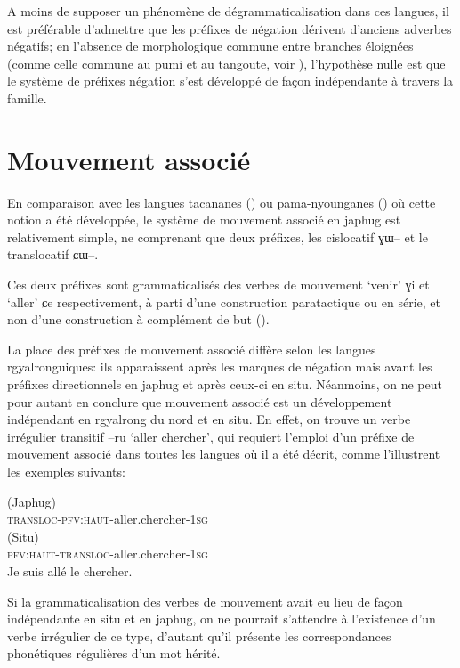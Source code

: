 \documentclass[oldfontcommands,oneside,a4paper,11pt]{article}
\newcommand{\ipa}[1]{{\phon \mbox{#1}}} %
\begin{document}
A moins de supposer un phénomène de dégrammaticalisation dans ces langues, il est préférable d'admettre que les préfixes de négation dérivent d'anciens adverbes négatifs; en l'absence de morphologique  commune entre branches éloignées (comme celle commune au pumi et au tangoute, voir \citealt{jacques11tangut.verb}), l'hypothèse nulle est que le système de préfixes négation s'est développé de façon indépendante à travers la famille.

\section{Mouvement associé} 
En comparaison avec les langues tacananes (\citealt{guillaume09mouv.assoc}) ou pama-nyounganes (\citealt{koch84associated.motion}) où cette notion a été développée, le système de mouvement associé en japhug est relativement simple, ne comprenant que deux préfixes, les cislocatif \ipa{ɣɯ--} et le translocatif \ipa{ɕɯ--}.

Ces deux préfixes sont grammaticalisés des verbes de mouvement `venir' \ipa{ɣi} et `aller' \ipa{ɕe} respectivement, à parti d'une construction paratactique ou en série, et non d'une construction à complément de but (\citealt{jacques13harmonization}).

La place des préfixes de mouvement associé diffère selon les langues rgyalronguiques: ils apparaissent après les marques de négation mais avant les préfixes directionnels en japhug et après ceux-ci en situ. Néanmoins, on ne peut pour autant en conclure que  mouvement associé est un développement indépendant en rgyalrong du nord et en situ. En effet, on trouve un verbe irrégulier transitif \ipa{--ru} `aller chercher', qui requiert l'emploi d'un préfixe de mouvement associé dans toutes les langues où il a été décrit, comme l'illustrent les exemples suivants:

\begin{exe}
 \ex  
 \gll  \ipa{\textbf{ɕ}-tɤ-ru-t-a}  (Japhug) \\
 \textsc{transloc-pfv:haut}-aller.chercher-\textsc{1sg} \\
\ex  
 \gll  \ipa{rə-\textbf{ɕɐ}-rô-ŋ}  (Situ) \\
 \textsc{pfv:haut-transloc}-aller.chercher-\textsc{1sg} \\
\glt Je suis allé le chercher.
\end{exe}
 Si la grammaticalisation des verbes de mouvement avait eu lieu de façon indépendante en situ et en japhug, on ne pourrait s'attendre à l'existence d'un verbe irrégulier de ce type, d'autant qu'il présente les correspondances phonétiques régulières d'un mot hérité.
\end{document}
